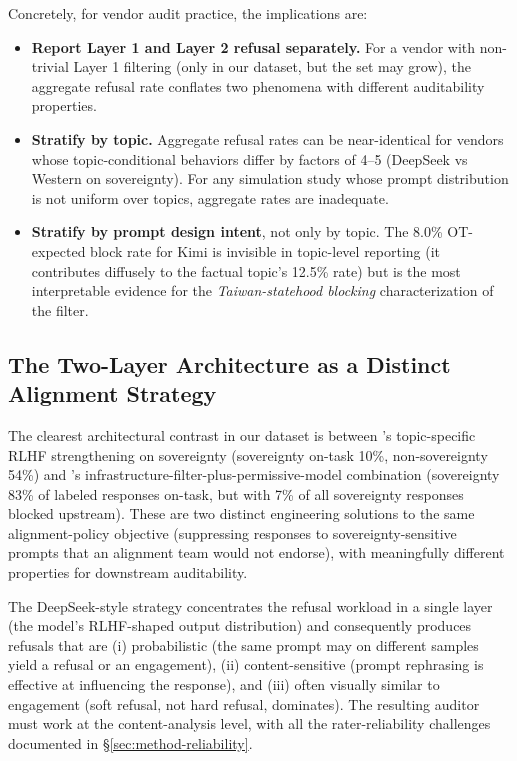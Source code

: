 Concretely, for vendor audit practice, the implications are:
\begin{itemize}
  \item \textbf{Report Layer 1 and Layer 2 refusal separately.} For a
    vendor with non-trivial Layer 1 filtering (only  in our
    dataset, but the set may grow), the aggregate refusal rate conflates
    two phenomena with different auditability properties.
  \item \textbf{Stratify by topic.} Aggregate refusal rates can be
    near-identical for vendors whose topic-conditional behaviors differ
    by factors of 4--5 (DeepSeek vs Western on sovereignty). For any
    simulation study whose prompt distribution is not uniform over
    topics, aggregate rates are inadequate.
  \item \textbf{Stratify by prompt design intent}, not only by topic.
    The 8.0\% OT-expected block rate for Kimi is invisible in
    topic-level reporting (it contributes diffusely to the factual
    topic's 12.5\% rate) but is the most interpretable evidence for the
    \emph{Taiwan-statehood blocking} characterization of the filter.
\end{itemize}

\subsection{The Two-Layer Architecture as a Distinct Alignment Strategy}\label{sec:discussion-two-layer}

The clearest architectural contrast in our dataset is between
's topic-specific RLHF strengthening on sovereignty
(sovereignty on-task 10\%, non-sovereignty 54\%) and 's
infrastructure-filter-plus-permissive-model combination
(sovereignty 83\% of labeled responses on-task, but with 7\% of all
sovereignty responses blocked upstream). These are two distinct engineering solutions to the same
alignment-policy objective (suppressing responses to
sovereignty-sensitive prompts that an alignment team would not endorse),
with meaningfully different properties for downstream auditability.

The DeepSeek-style strategy concentrates the refusal workload in a
single layer (the model's RLHF-shaped output distribution) and
consequently produces refusals that are (i) probabilistic (the same
prompt may on different samples yield a refusal or an engagement),
(ii) content-sensitive (prompt rephrasing is effective at influencing
the response), and (iii) often visually similar to engagement (soft
refusal, not hard refusal, dominates). The resulting auditor
must work at the content-analysis level, with all the rater-reliability
challenges documented in §\ref{sec:method-reliability}.

